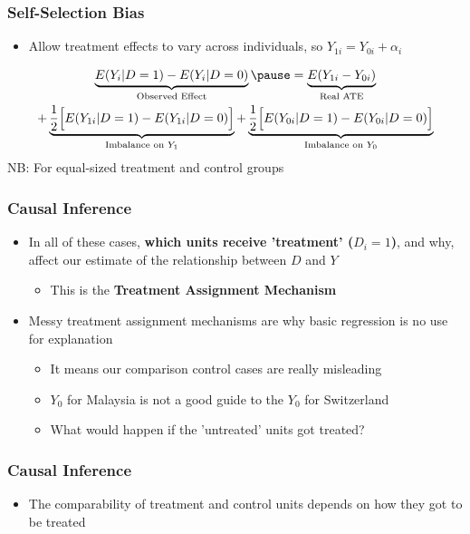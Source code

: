 \documentclass[xcolor=x11names,compress]{beamer}\usepackage[]{graphicx}\usepackage[]{color}
\renewcommand{\(}{\begin{columns}}
\renewcommand{\)}{\end{columns}}
\newcommand{\<}[1]{\begin{column}{#1}}
\renewcommand{\>}{\end{column}}
\begin{document}
\begin{frame}
\frametitle{Self-Selection Bias}
\begin{itemize}
\item Allow treatment effects to vary across individuals, so $Y_{1i} = Y_{0i} + \alpha_i$
\end{itemize}
\pause
\begin{multline}
\underbrace{E(Y_i|D=1)-E(Y_i|D=0)}_\text{Observed Effect} \pause = \underbrace{E(Y_{1i} - Y_{0i})}_\text{Real ATE} \\ + \underbrace{\frac{1}{2}\Big[ E(Y_{1i}|D=1) - E(Y_{1i}|D=0) \Big]}_\text{Imbalance on $Y_1$} + \underbrace{\frac{1}{2}\Big[ E(Y_{0i}|D=1) - E(Y_{0i}|D=0) \Big]}_\text{Imbalance on $Y_0$}
\end{multline}
\footnotesize
NB: For equal-sized treatment and control groups
\normalsize\end{frame}

\begin{frame}
\frametitle{Causal Inference}
\begin{itemize}
\item In all of these cases, \textbf{which units receive 'treatment' ($D_i=1$)}, and why, affect our estimate of the relationship between $D$ and $Y$
\pause
\begin{itemize}
\item This is the \textbf{Treatment Assignment Mechanism}
\pause
\end{itemize}
\item Messy treatment assignment mechanisms are why basic regression is no use for explanation
\pause
\begin{itemize}
\item It means our comparison control cases are really misleading
\pause
\item $Y_0$ for Malaysia is not a good guide to the $Y_0$ for Switzerland
\pause
\item What would happen if the 'untreated' units got treated?
\end{itemize}
\end{itemize}
\end{frame}


\begin{frame}
\frametitle{Causal Inference}
\begin{itemize}
\item The comparability of treatment and control units depends on how they got to be treated
\pause
{}
\end{itemize}
\end{frame}
\end{document}
